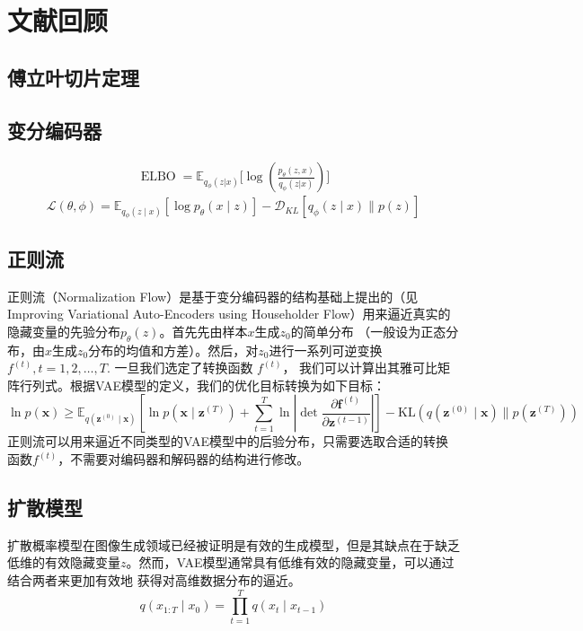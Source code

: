 \chapter{文献回顾}

\section{傅立叶切片定理}


\section{变分编码器}
\begin{align}
    \operatorname{ELBO}=\mathbb{E}_{q_{\phi}(z|x)}\big[\log(\frac{p_{\theta}(z,x)}{q_{\phi}(z|x)})\big]
\end{align}
\begin{equation}
    \mathcal{L}(\theta, \phi)=\mathbb{E}_{q_\phi(z \mid x)}\left[\log p_\theta(x \mid z)\right]-\mathcal{D}_{K L}\left[q_\phi(z \mid x) \| p(z)\right]
    \end{equation}
\section{正则流}
正则流（Normalization Flow）是基于变分编码器的结构基础上提出的（见Improving Variational Auto-Encoders
using Householder Flow）用来逼近真实的隐藏变量的先验分布$p_{\theta}(z)$。首先先由样本$x$生成$z_0$的简单分布
（一般设为正态分布，由$x$生成$z_0$分布的均值和方差）。然后，对$z_0$进行一系列可逆变换$f^{(t)},t=1,2,\dots,T$. 一旦我们选定了转换函数
$f^{(t)}$， 我们可以计算出其雅可比矩阵行列式。根据VAE模型的定义，我们的优化目标转换为如下目标：
\begin{equation}
    \ln p(\mathbf{x}) \geq \mathbb{E}_{q\left(\mathbf{z}^{(0)} \mid \mathbf{x}\right)}\left[\ln p\left(\mathbf{x} \mid \mathbf{z}^{(T)}\right)+\sum_{t=1}^T \ln \left|\operatorname{det} \frac{\partial \mathbf{f}^{(t)}}{\partial \mathbf{z}^{(t-1)}}\right|\right]-\mathrm{KL}\left(q\left(\mathbf{z}^{(0)} \mid \mathbf{x}\right) \| p\left(\mathbf{z}^{(T)}\right)\right)
    \label{NF objective}
    \end{equation}
正则流可以用来逼近不同类型的VAE模型中的后验分布，只需要选取合适的转换函数$f^{(t)}$，不需要对编码器和解码器的结构进行修改。
\section{扩散模型}
扩散概率模型在图像生成领域已经被证明是有效的生成模型，但是其缺点在于缺乏低维的有效隐藏变量$z$。然而，VAE模型通常具有低维有效的隐藏变量，可以通过结合两者来更加有效地
获得对高维数据分布的逼近。
\begin{equation}
    q\left(x_{1: T} \mid x_0\right)=\prod_{t=1}^T q\left(x_t \mid x_{t-1}\right)
    \end{equation}


